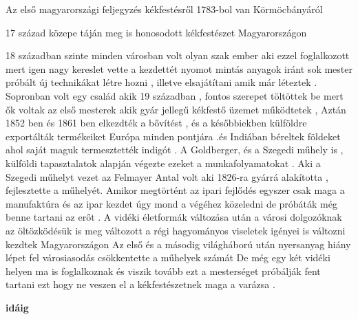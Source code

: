 \documentclass[fontsize=12pt, appendixprefix=true]{scrreprt}
\begin{document}
Az első magyarországi feljegyzés kékfestésről 1783-bol  van Körmöcbányáról 

17 század közepe táján  meg is honosodott kékfestészet Magyarországon 

18 században szinte minden városban volt olyan szak ember aki ezzel foglalkozott mert igen nagy kereslet vette a kezdettét nyomot mintás anyagok iránt sok mester próbált új technikákat létre hozni , illetve  elsajátítani amik már léteztek .
 Sopronban volt egy  család akik  19 században ,  fontos szerepet töltöttek be  mert ők voltak az első mesterek akik gyár jellegű kékfestő üzemet működtetek ,
 Aztán 1852 ben és 1861 ben  elkezdték  a bővítést , és a későbbiekben külföldre exportálták termékeiket  Európa minden  pontjára .és  Indiában béreltek földeket ahol saját maguk termesztették indigót  .
A  Goldberger, és a Szegedi  műhely is , külföldi tapasztalatok alapján végezte  ezeket a  munkafolyamatokat .
  Aki a Szegedi műhelyt vezet az  Felmayer Antal volt aki 1826-ra gyárrá alakította , fejlesztette a műhelyét.
Amikor megtörtént az ipari fejlődés egyszer csak maga a manufaktúra és az ipar kezdet úgy mond a végéhez közeledni de próbáták még benne tartani az erőt .
A vidéki életformák változása után a városi dolgozóknak az öltözködésük is meg változott a régi hagyományos viseletek igényei is változni kezdtek Magyarországon 
Az első és a másodig világháború után nyersanyag hiány lépet fel városiasodás csökkentette a műhelyek számát 
De még egy két vidéki helyen ma is foglalkoznak és viszik tovább ezt a mesterséget próbálják fent tartani ezt hogy ne veszen el a kékfestészetnek maga a varázsa .

\textbf{idáig}
\end{document}
